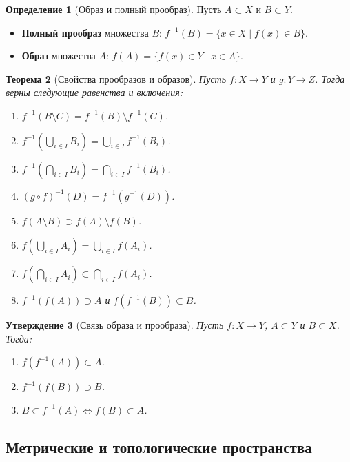\documentclass[12pt,a4paper]{article}
\newtheorem{theorem}{Теорема}[section]
\newtheorem{proposition}[theorem]{Утверждение}
\theoremstyle{definition}
\newtheorem{definition}[theorem]{Определение}
\begin{document}
\begin{definition}[Образ и полный прообраз]
Пусть $A \subset X$ и $B \subset Y$.
\begin{itemize}
    \item \textbf{Полный прообраз} множества $B$: $f^{-1}(B) = \{x \in X \mid f(x) \in B\}$.
    \item \textbf{Образ} множества $A$: $f(A) = \{f(x) \in Y \mid x \in A\}$.
\end{itemize}
\end{definition}

\begin{theorem}[Свойства прообразов и образов]
Пусть $f: X \to Y$ и $g: Y \to Z$. Тогда верны следующие равенства и включения:
\begin{enumerate}
    \item $f^{-1}(B \setminus C) = f^{-1}(B) \setminus f^{-1}(C)$.
    \item $f^{-1}\left(\bigcup_{i \in I} B_i\right) = \bigcup_{i \in I} f^{-1}(B_i)$.
    \item $f^{-1}\left(\bigcap_{i \in I} B_i\right) = \bigcap_{i \in I} f^{-1}(B_i)$.
    \item $(g \circ f)^{-1}(D) = f^{-1}(g^{-1}(D))$.
    \item $f(A \setminus B) \supset f(A) \setminus f(B)$.
    \item $f\left(\bigcup_{i \in I} A_i\right) = \bigcup_{i \in I} f(A_i)$.
    \item $f\left(\bigcap_{i \in I} A_i\right) \subset \bigcap_{i \in I} f(A_i)$.
    \item $f^{-1}(f(A)) \supset A$ и $f(f^{-1}(B)) \subset B$.
\end{enumerate}
\end{theorem}

\begin{proposition}[Связь образа и прообраза]
Пусть $f: X \to Y$, $A \subset Y$ и $B \subset X$. Тогда:
\begin{enumerate}
    \item $f(f^{-1}(A)) \subset A$.
    \item $f^{-1}(f(B)) \supset B$.
    \item $B \subset f^{-1}(A) \iff f(B) \subset A$.
\end{enumerate}
\end{proposition}

\subsection{Метрические и топологические пространства}
\end{document}
